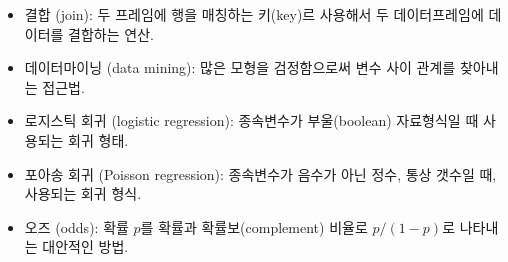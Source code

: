 \begin{itemize}
\item 결합 (join): 두 프레임에 행을 매칭하는 키(key)르 사용해서 두 데이터프레임에 데이터를 결합하는 연산.

\item 데이터마이닝 (data mining): 많은 모형을 검정함으로써 변수 사이 관계를 찾아내는 접근법.

\item 로지스틱 회귀 (logistic regression): 종속변수가 부울(boolean) 자료형식일 때 사용되는 회귀 형태.

\item 포아송 회귀 (Poisson regression): 종속변수가 음수가 아닌 정수, 통상 갯수일 때, 사용되는 회귀 형식.

\item 오즈 (odds): 확률 $p$를 확률과 확률보(complement) 비율로 $p / (1-p)$로 나타내는 대안적인 방법.

\end{itemize}

